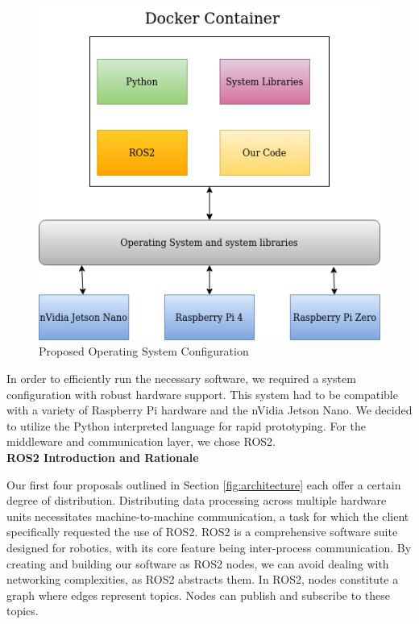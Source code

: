 \begin{figure}[H]
    \centering
    \includegraphics[scale=0.5]{fig/osdiag.png}
    \caption{Proposed Operating System Configuration}
    \label{fig:operating_system_proposed}
\end{figure}

In order to efficiently run the necessary software, we required a system configuration with robust hardware support. This system had to be compatible with a variety of Raspberry Pi hardware and the nVidia Jetson Nano. We decided to utilize the Python interpreted language for rapid prototyping. For the middleware and communication layer, we chose ROS2. \\

\textbf{ROS2 Introduction and Rationale}

Our first four proposals outlined in Section \ref{fig:architecture} each offer a certain degree of distribution. Distributing data processing across multiple hardware units necessitates machine-to-machine communication, a task for which the client specifically requested the use of ROS2. ROS2 is a comprehensive software suite designed for robotics, with its core feature being inter-process communication. By creating and building our software as ROS2 nodes, we can avoid dealing with networking complexities, as ROS2 abstracts them. In ROS2, nodes constitute a graph where edges represent topics. Nodes can publish and subscribe to these topics.\\

